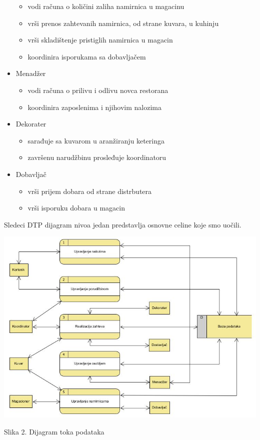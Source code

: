 \begin{itemize}
\begin{itemize}
        \item vodi računa o količini zaliha namirnica u magacinu
        \item vrši prenos zahtevanih namirnica, od strane kuvara, u kuhinju
        \item vrši skladištenje pristiglih namirnica u magacin
        \item koordinira isporukama sa dobavljačem
    \end{itemize}
    \item Menadžer
    \begin{itemize}
        \item vodi računa o prilivu i odlivu novca restorana
        \item koordinira zaposlenima i njihovim nalozima
    \end{itemize}
    \item Dekorater
    \begin{itemize}
        \item sarađuje sa kuvarom u aranžiranju keteringa
        \item završenu narudžbinu prosleđuje koordinatoru
    \end{itemize}
    \item Dobavljač
    \begin{itemize}
        \item vrši prijem dobara od strane distrbutera
        \item vrši isporuku dobara u magacin
    \end{itemize}
\end{itemize}


Sledeci DTP dijagram nivoa jedan predstavlja osnovne celine koje smo uočili. 
\begin{center}
\includegraphics[width = 160mm]{slike/DTP.jpg}
\caption{Slika 2. Dijagram toka podataka}
\end{center}
